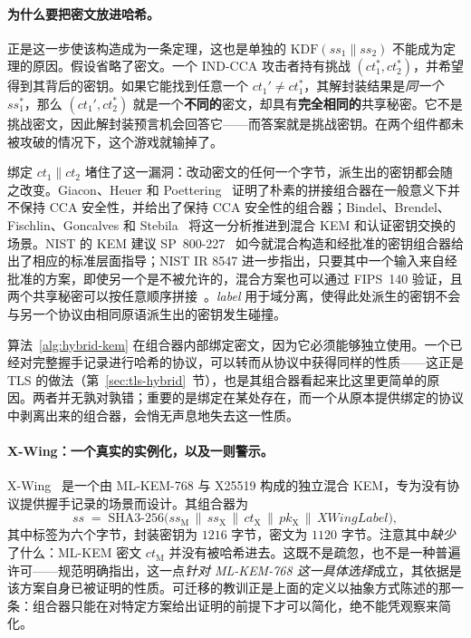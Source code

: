 \paragraph{为什么要把密文放进哈希。}
正是这一步使该构造成为一条定理，这也是单独的 $\mathrm{KDF}(ss_1 \| ss_2)$ 不能成为定理的原因。假设省略了密文。一个 IND-CCA 攻击者持有挑战 $(ct_1^{*}, ct_2^{*})$，并希望得到其背后的密钥。如果它能找到任意一个 $ct_1' \neq ct_1^{*}$，其解封装结果是\emph{同一个} $ss_1^{*}$，那么 $(ct_1', ct_2^{*})$ 就是一个\textbf{不同的}密文，却具有\textbf{完全相同的}共享秘密。它不是挑战密文，因此解封装预言机会回答它——而答案就是挑战密钥。在两个组件都未被攻破的情况下，这个游戏就输掉了。

绑定 $ct_1 \| ct_2$ 堵住了这一漏洞：改动密文的任何一个字节，派生出的密钥都会随之改变。Giacon、Heuer 和 Poettering~\cite{ghp2018} 证明了朴素的拼接组合器在一般意义下并不保持 CCA 安全性，并给出了保持 CCA 安全性的组合器；Bindel、Brendel、Fischlin、Goncalves 和 Stebila~\cite{bbfgs2019} 将这一分析推进到混合 KEM 和认证密钥交换的场景。NIST 的 KEM 建议 SP~800-227~\cite{nistsp800227} 如今就混合构造和经批准的密钥组合器给出了相应的标准层面指导；NIST IR 8547 进一步指出，只要其中一个输入来自经批准的方案，即使另一个是不被允许的，混合方案也可以通过 FIPS~140 验证，且两个共享秘密可以按任意顺序拼接~\cite{nistir8547}。\emph{label} 用于域分离，使得此处派生的密钥不会与另一个协议由相同原语派生出的密钥发生碰撞。

\begin{remark}[绑定可以存在的两个位置]
算法~\ref{alg:hybrid-kem} 在组合器内部绑定密文，因为它必须能够独立使用。一个已经对完整握手记录进行哈希的协议，可以转而从协议中获得同样的性质——这正是 TLS 的做法（第~\ref{sec:tls-hybrid}~节），也是其组合器看起来比这里更简单的原因。两者并无孰对孰错；重要的是绑定在某处存在，而一个从原本提供绑定的协议中剥离出来的组合器，会悄无声息地失去这一性质。
\end{remark}

\paragraph{X-Wing：一个真实的实例化，以及一则警示。}
X-Wing~\cite{xwing2024} 是一个由 ML-KEM-768 与 X25519 构成的独立混合 KEM，专为没有协议提供握手记录的场景而设计。其组合器为
\[
  ss \;=\; \mathrm{SHA3\text{-}256}\big(ss_{\mathrm{M}} \,\|\, ss_{\mathrm{X}} \,\|\, ct_{\mathrm{X}} \,\|\, pk_{\mathrm{X}} \,\|\, \textit{XWingLabel}\big),
\]
其中标签为六个字节，封装密钥为 $1216$ 字节，密文为 $1120$ 字节。注意其中\emph{缺少}了什么：ML-KEM 密文 $ct_{\mathrm{M}}$ 并没有被哈希进去。这既不是疏忽，也不是一种普遍许可——规范明确指出，这一点\emph{针对 ML-KEM-768 这一具体选择}成立，其依据是该方案自身已被证明的性质。可迁移的教训正是上面的定义以抽象方式陈述的那一条：组合器只能在对特定方案给出证明的前提下才可以简化，绝不能凭观察来简化。

